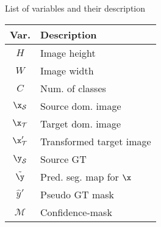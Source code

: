 \begin{margintable}[]\small
\caption{List of variables and their description}
\label{tab:tist_var_list}
\begin{tabular}{@{}cl@{}}
\toprule
\textbf{Var.}       & \textbf{Description}                                                                                         \\ \midrule
$H$            & Image height        \\
$W$            & Image width         \\
$C$            & Num. of classes     \\
$\x_\mathcal{S}$ & Source dom. image      \\
$\x_\mathcal{T}$ & Target dom. image      \\
$\x'_\mathcal{T}$ & Transformed target image     \\
$\y_\mathcal{S}$ & Source GT      \\
$\tilde{\y}$ & Pred. seg. map for $\x$   \\
$\hat{y}'$ & Pseudo GT mask \\
$\mathcal{M}$        & Confidence-mask     \\ \bottomrule
\end{tabular}
\end{margintable}